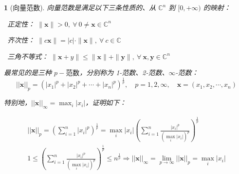 \documentclass[zihao=5,UTF8]{report}
\def\C{\mathbb{C}}
\theoremstyle{MyTheoremStyle} %
\theoremstyle{MySubsubsectionStyle} %
\newtheorem{definition}{}
\begin{document}
\begin{definition}[向量范数]
向量范数是满足以下三条性质的、从 $\C^n$ 到 $[0, +\infty)$ 的映射：

\par{}\ 正定性： $\| \boldsymbol{x} \| >0,\ \forall\  0 \ne \boldsymbol{x} \in \C^n$   \par
{}\ 齐次性： $\| c\boldsymbol{x} \| = | c |\cdot \| \boldsymbol{x} \|,\ \forall\  c \in \C$   \par
{}\  三角不等式： $\| \boldsymbol{x}+y \| \leqslant  \| \boldsymbol{x} \| + \| \boldsymbol{y} \|,\ \forall\  \boldsymbol{x},\boldsymbol{y} \in \C^n$   \par\noindent

最常见的是三种 $p-\text{范数}$，分别称为 1-范数、2-范数、$\infty$-范数：
\begin{equation}
    ||\boldsymbol{x}||_p=(|x_1|^p+|x_2|^p+\cdots+|x_n|^p)^{\frac{1}{p}},\quad p=1,2,\infty,\quad \boldsymbol{x} = (x_1, x_2, \cdots, x_n)
\end{equation}

特别地，$||\boldsymbol{x}||_{\infty} = \max_i|x_i|$，证明如下：

\begin{gather}
    ||\boldsymbol{x}||_{p}=\left(\sum_{i=1}^{n}|x_{i}|^{p}\right)^{\frac{1}{p}}=\max_{i}|x_{i}|\left(\sum_{i=1}^{n}\frac{|x_{i}|^{p}}{(\max_{i}|x_{i}|)^{p}}\right)^{\frac{1}{p}} \\ 
    1\leqslant\left(\sum_{i=1}^n\frac{|x_i|^p}{(\max_i|x_i|)^p}\right)^{\frac1p}\leqslant n^{\frac1p}
    \Longrightarrow ||\boldsymbol{x}||_{\infty}=\operatorname*{lim}_{p\to\infty}||\boldsymbol{x}||_{p}=\max_{i}|x_{i}|
\end{gather}

\end{definition}
\end{document}
